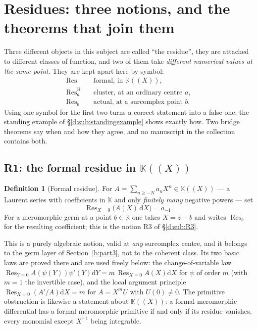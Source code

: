 \documentclass[11pt,a4paper]{article}
\numberwithin{equation}{section}
\theoremstyle{definition}
\newtheorem{definition}[theorem]{Definition}
\theoremstyle{remark}
\theoremstyle{plain}
\newcommand{\K}{\mathbb K}
\DeclareMathOperator{\Res}{Res}                 %
\newcommand{\ResH}[1]{\Res^{\mathrm H}_{#1}}    %
\newcommand{\Resat}[1]{\Res_{#1}}               %
\newcommand{\dd}{\mathrm d}
\begin{document}

\section{Residues: three notions, and the theorems that join them}
\label{d:sec:residues}

Three different objects in this subject are called ``the residue'',
they are attached to different classes of function, and two of them
take \emph{different numerical values at the same point}.  They are
kept apart here by symbol:
\[
 \begin{aligned}
 \Res&\quad\text{formal, in }\K((X)),\\
 \ResH a&\quad\text{cluster, at an ordinary centre }a,\\
 \Resat b&\quad\text{actual, at a surcomplex point }b.
 \end{aligned}
\]
Using one symbol for the first two turns a correct statement into a
false one; the standing example of
\S\ref{d:sub:standingexample} shows exactly how.  Two bridge theorems
say when and how they agree, and no manuscript in the collection
contains both.

\subsection{R1: the formal residue in \texorpdfstring{$\K((X))$}{K((X))}}
\label{d:sub:R1}

\begin{definition}[Formal residue]
\label{d:def:formalres}
For $A=\sum_{n\ge-N}a_nX^{n}\in\K((X))$ --- a Laurent series with
coefficients in $\K$ and only \emph{finitely many} negative powers ---
set
\[
 \Res_{X=0}\bigl(A(X)\,\dd X\bigr)=a_{-1}.
\]
For a meromorphic germ at a point $b\in\K$ one takes $X=z-b$ and writes
$\Resat{b}$ for the resulting coefficient; this is the notion R3 of
\S\ref{d:sub:R3}.
\end{definition}

This is a purely algebraic notion, valid at \emph{any} surcomplex
centre, and it belongs to the germ layer of Section~\ref{b:part3}, not to the coherent
class.  Its two basic laws are proved there and are used freely below:
the change-of-variable law
$\Res_{Y=0}A(\psi(Y))\psi'(Y)\dd Y=m\,\Res_{X=0}A(X)\dd X$ for
$\psi$ of order $m$ (with $m=1$ the invertible case), and the local
argument principle $\Res_{X=0}(A'/A)\dd X=m$ for $A=X^{m}U$ with
$U(0)\ne0$.  The primitive obstruction is likewise a statement about
$\K((X))$: a formal meromorphic differential has a formal meromorphic
primitive if and only if its residue vanishes, every monomial except
$X^{-1}$ being integrable.
\end{document}
